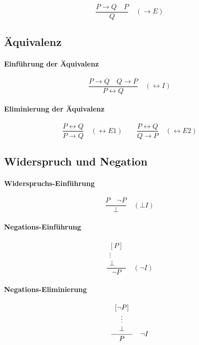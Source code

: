 \documentclass{book}
\theoremstyle{plain}
\theoremstyle{remark}
\theoremstyle{definition}
\begin{document}
\[
\frac{P \to Q \quad P}{Q}
\quad (\to E)
\]

\subsection{Äquivalenz}
\label{sec:leftrightarrow-rules}

\paragraph{Einführung der Äquivalenz}
\label{rule:LRI}

\[
\frac{P \to Q \quad Q \to P}{P \leftrightarrow Q}
\quad (\leftrightarrow I)
\]

\paragraph{Eliminierung der Äquivalenz}
\label{rule:LRE1}\label{rule:LRE2}

\[
\frac{P \leftrightarrow Q}{P \to Q}
\quad (\leftrightarrow E1)
\qquad
\frac{P \leftrightarrow Q}{Q \to P}
\quad (\leftrightarrow E2)
\]

\subsection{Widerspruch und Negation}
\label{sec:bot-neg-rules}

\paragraph{Widerspruchs-Einführung}
\label{rule:BI}

\[
\frac{P \quad \neg P}{\bot}
\quad (\bot I)
\]

\paragraph{Negations-Einführung}
\label{rule:CI}

\[
\frac{
   \begin{array}{c}
     [P]\\
     \vdots\\
     \bot
   \end{array}
}{\neg P}
\quad (\neg I)
\]

\paragraph{Negations-Eliminierung}
\label{rule:CE}

\[
\frac{
\begin{array}{c}
\text{[\ensuremath{\neg P}]} \\
\vdots \\
\bot
\end{array}
}{P}
\quad \neg I
\]
\end{document}
